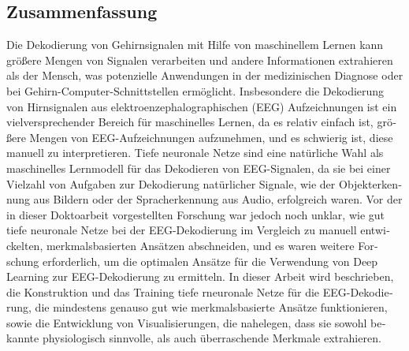 \begin{otherlanguage}{ngerman}
\chapter*{Zusammenfassung}
Die Dekodierung von Gehirnsignalen mit Hilfe von maschinellem Lernen kann größere Mengen von Signalen verarbeiten und andere Informationen extrahieren als der Mensch, was potenzielle Anwendungen in der medizinischen Diagnose oder bei Gehirn-Computer-Schnittstellen ermöglicht. Insbesondere die Dekodierung von Hirnsignalen aus elektroenzephalographischen (EEG) Aufzeichnungen ist ein vielversprechender Bereich für maschinelles Lernen, da es relativ einfach ist, größere Mengen von EEG-Aufzeichnungen aufzunehmen, und es schwierig ist, diese manuell zu interpretieren. Tiefe neuronale Netze sind eine natürliche Wahl als maschinelles Lernmodell für das Dekodieren von EEG-Signalen, da sie bei einer Vielzahl von Aufgaben zur Dekodierung natürlicher Signale, wie der Objekterkennung aus Bildern oder der Spracherkennung aus Audio, erfolgreich waren. Vor der in dieser Doktoarbeit vorgestellten Forschung war jedoch noch unklar, wie gut tiefe neuronale Netze bei der EEG-Dekodierung im Vergleich zu manuell entwickelten, merkmalsbasierten Ansätzen abschneiden, und es waren weitere Forschung erforderlich, um die optimalen Ansätze für die Verwendung von Deep Learning zur EEG-Dekodierung zu ermitteln. In dieser Arbeit wird beschrieben, die Konstruktion und das Training tiefe rneuronale Netze für die EEG-Dekodierung, die mindestens genauso gut wie merkmalsbasierte Ansätze funktionieren, sowie die Entwicklung von Visualisierungen, die nahelegen, dass sie sowohl bekannte physiologisch sinnvolle, als auch überraschende Merkmale extrahieren.
\end{otherlanguage}

\endgroup

\vfill
